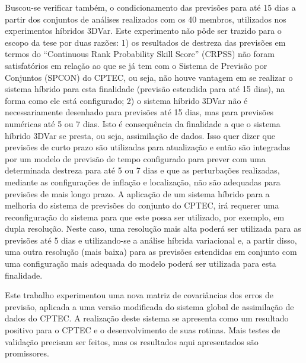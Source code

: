 Buscou-se verificar também, o condicionamento das previsões para até 15 dias a partir dos conjuntos de análises realizados com os 40 membros, utilizados nos experimentos híbridos 3DVar. Este experimento não pôde ser trazido para o escopo da tese por duas razões: 1) os resultados de destreza das previsões em termos do ``Continuous Rank Probability Skill Score'' (CRPSS) não foram satisfatórios em relação ao que se já tem com o Sistema de Previsão por Conjuntos (SPCON) do CPTEC, ou seja, não houve vantagem em se realizar o sistema híbrido para esta finalidade (previsão estendida para até 15 dias), na forma como ele está configurado; 2) o sistema híbrido 3DVar não é necessariamente desenhado para previsões até 15 dias, mas para previsões numéricas até 5 ou 7 dias. Isto é consequência da finalidade a que o sistema híbrido 3DVar se presta, ou seja, assimilação de dados. Isso quer dizer que previsões de curto prazo são utilizadas para atualização e então são integradas por um modelo de previsão de tempo configurado para prever com uma determinada destreza para até 5 ou 7 dias e que as perturbações realizadas, mediante as configurações de inflação e localização, não são adequadas para previsões de mais longo prazo. A aplicação de um sistema híbrido para a melhoria do sistema de previsões do conjunto do CPTEC, irá requerer uma reconfiguração do sistema para que este possa ser utilizado, por exemplo, em dupla resolução. Neste caso, uma resolução mais alta poderá ser utilizada para as previsões até 5 dias e utilizando-se a análise híbrida variacional e, a partir disso, uma outra resolução (mais baixa) para as previsões estendidas em conjunto com uma configuração mais adequada do modelo poderá ser utilizada para esta finalidade.


Este trabalho experimentou uma nova matriz de covariâncias dos erros de previsão, aplicada a uma versão modificada do sistema global de assimilação de dados do CPTEC. A realização deste sistema se apresenta como um resultado positivo para o CPTEC e o desenvolvimento de suas rotinas. Mais testes de validação precisam ser feitos, mas os resultados aqui apresentados são promissores.

